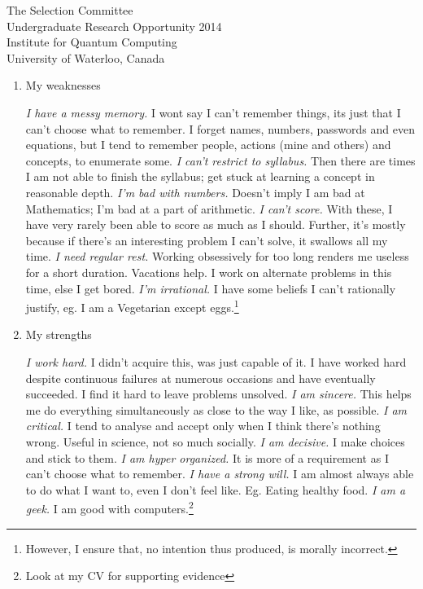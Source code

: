 \documentclass{letter}
\begin{document}
\begin{letter}{The Selection Committee\\Undergraduate Research Opportunity 2014\\Institute for Quantum Computing\\University of Waterloo, Canada}
\begin{enumerate}

\item My weaknesses

\emph{I have a messy memory.} I wont say I can't remember things, its just that I can't choose what to remember. I forget names, numbers, passwords and even equations, but I tend to remember people, actions (mine and others) and concepts, to enumerate some.
\emph{I can't restrict to syllabus.} Then there are times I am not able to finish the syllabus; get stuck at learning a concept in reasonable depth.
\emph{I'm bad with numbers.} Doesn't imply I am bad at Mathematics; I'm bad at a part of arithmetic.
\emph{I can't score.} With these, I have very rarely been able to score as much as I should. Further, it's mostly because if there's an interesting problem I can't solve, it swallows all my time. 
\emph{I need regular rest.} Working obsessively for too long renders me useless for a short duration. Vacations help. I work on alternate problems in this time, else I get bored.
\emph{I'm irrational.} I have some beliefs I can't rationally justify, eg. I am a Vegetarian except eggs.\footnote{However, I ensure that, no intention thus produced, is morally incorrect.}

\item My strengths

\emph{I work hard.} I didn't acquire this, was just capable of it. I have worked hard despite continuous failures at numerous occasions and have eventually succeeded. I find it hard to leave problems unsolved.
\emph{I am sincere.} This helps me do everything simultaneously as close to the way I like, as possible.
\emph{I am critical.} I tend to analyse and accept only when I think there's nothing wrong. Useful in science, not so much socially.
\emph{I am decisive.} I make choices and stick to them.
\emph{I am hyper organized.} It is more of a requirement as I can't choose what to remember.
\emph{I have a strong will.} I am almost always able to do what I want to, even I don't feel like. Eg. Eating healthy food.
\emph{I am a geek.} I am good with computers.\footnote{Look at my CV for supporting evidence}



\end{enumerate}
\end{letter}
\end{document}
